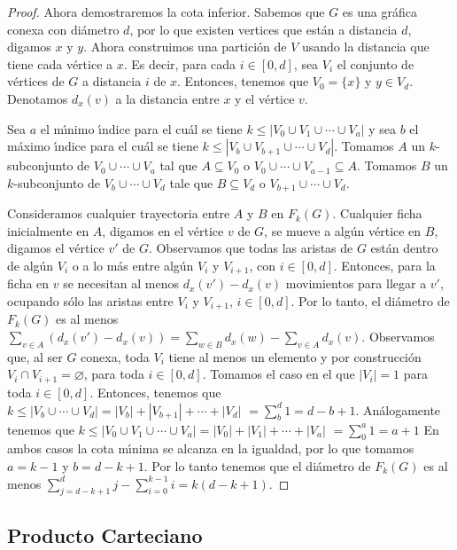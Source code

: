 \begin{proof}
Ahora demostraremos la cota inferior. Sabemos que $G$ es una gr\'afica conexa
con di\'ametro $d$, por lo que existen vertices que est\'an a distancia
$d$, digamos $x$ y $y$. Ahora construimos una partici\'on de $V$ usando  la
distancia que tiene cada v\'ertice a $x$. Es decir, para cada $i\in [0,d]$,
sea $V_{i}$ el conjunto de v\'ertices de $G$ a distancia $i$ de $x$. Entonces,
tenemos que $V_{0}=\{x\}$ y $y\in V_{d}$. Denotamos $d_x(v)$ a la distancia
entre $x$ y el v\'ertice $v$.

Sea $a$ el m\'\i{}nimo \'\i{}ndice para el cu\'al se tiene $k \leq |V_{0}\cup
V_{1}\cup \cdots \cup V_{a}|$ y sea $b$ el m\'aximo \'\i{}ndice para el cu\'al se
tiene $k\leq |V_{b}\cup V_{b+1}\cup \cdots \cup V_{d}|$. Tomamos $A$ un
$k$-subconjunto de $V_{0}\cup \cdots \cup V_{a}$  tal que $A\subseteq
V_{0}$ o $V_{0}\cup \cdots \cup V_{a-1}\subseteq A$. Tomamos $B$ un
$k$-subconjunto de $V_{b}\cup \cdots \cup V_{d}$ tale que
$B\subseteq V_{d}$ o $V_{b+1}\cup \cdots \cup V_{d}$. 

Consideramos cualquier trayectoria entre $A$ y $B$ en $F_{k}(G)$. Cualquier
ficha inicialmente en $A$, digamos en el v\'ertice $v$ de $G$, se mueve a
alg\'un v\'ertice en $B$, digamos el v\'ertice $v'$ de $G$. Observamos que todas
las aristas de $G$ est\'an dentro de alg\'un $V_{i}$ o a lo m\'as entre alg\'un
$V_{i}$ y $V_{i+1}$, con $i\in[0,d]$. Entonces, para la ficha en $v$ se
necesitan al menos $d_x(v')-d_x(v)$ movimientos para llegar a $v'$, ocupando
s\'olo las aristas entre $V_{i}$ y $V_{i+1}$, $i\in [0,d]$. Por lo tanto,
el di\'ametro de $F_{k}(G)$ es al menos $\sum_{v\in A}(d_x(v')-d_x(v))=
\sum_{w\in B}d_x(w)-\sum_{v\in A}d_x(v)$. Observamos que, al ser $G$ conexa,
toda $V_{i}$ tiene al menos un elemento y por construcci\'on $V_{i} \cap
V_{i+1}=\varnothing$, para toda $i\in [0,d]$. Tomamos el caso en el que
$|V_{i}|=1$ para toda $i\in [0,d]$. Entonces, tenemos que $k\leq
|V_{b}\cup\cdots\cup V_{d}|=|V_{b}|+|V_{b+1}|+\cdots +|V_d|$
$=\sum_{b}^{d}1 = d -b+1$. An\'alogamente tenemos que $k\leq
|V_{0}\cup V_{1}\cup \cdots \cup V_{a}|=|V_{0}|+|V_{1}|+\cdots + |V_{a}|$
$=\sum_{0}^{a} 1 = a+1$ En ambos casos la cota m\'\i{}nima se alcanza en la
igualdad, por lo que tomamos $a=k-1$ y $b=d-k+1$. Por lo tanto tenemos que
el di\'ametro de $F_{k}(G)$ es al menos $\sum_{j=d -k+1}^{d}j -
\sum_{i=0}^{k-1}i = k(d-k+1)$.
\end{proof}

\subsection{Producto Carteciano}%
\label{sec:PCartes}

